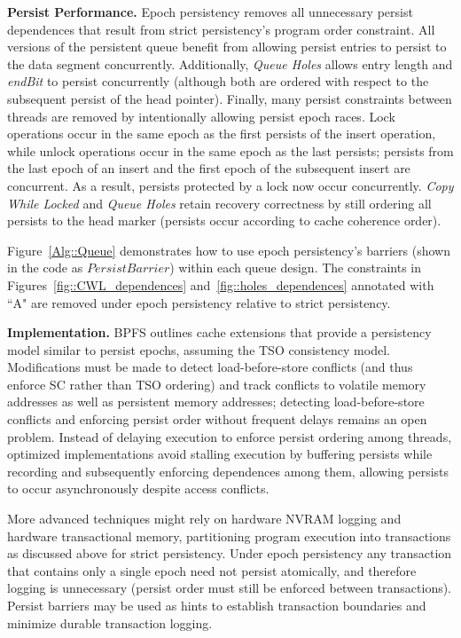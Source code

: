 \textbf{Persist Performance.}
Epoch persistency removes all unnecessary persist dependences that result from strict persistency's program order constraint.
All versions of the persistent queue benefit from allowing persist entries to persist to the data segment concurrently.
Additionally, \emph{Queue Holes} allows entry length and \emph{endBit} to persist concurrently (although both are ordered with respect to the subsequent persist of the head pointer).
Finally, many persist constraints between threads are removed by intentionally allowing persist epoch races.
Lock operations occur in the same epoch as the first persists of the insert operation, while unlock operations occur in the same epoch as the last persists; persists from the last epoch of an insert and the first epoch of the subsequent insert are concurrent.
As a result, persists protected by a lock now occur concurrently.
\emph{Copy While Locked} and \emph{Queue Holes} retain recovery correctness by still ordering all persists to the head marker (persists occur according to cache coherence order).

Figure~\ref{Alg::Queue} demonstrates how to use epoch persistency's barriers (shown in the code as $PersistBarrier$) within each queue design.
The constraints in Figures~\ref{fig::CWL_dependences} and~\ref{fig::holes_dependences} annotated with ``A" are removed under epoch persistency relative to strict persistency.

\textbf{Implementation.}
BPFS \cite{ConditNightingale09} outlines cache extensions that provide a persistency model similar to persist epochs, assuming the TSO consistency model.
Modifications must be made to detect load-before-store conflicts (and thus enforce SC rather than TSO ordering) and track conflicts to volatile memory addresses as well as persistent memory addresses; detecting load-before-store conflicts and enforcing persist order without frequent delays remains an open problem.
Instead of delaying execution to enforce persist ordering among threads, optimized implementations avoid stalling execution by buffering persists while recording and subsequently enforcing dependences among them, allowing persists to occur asynchronously despite access conflicts.

More advanced techniques might rely on hardware NVRAM logging and hardware transactional memory, partitioning program execution into transactions as discussed above for strict persistency.
Under epoch persistency any transaction that contains only a single epoch need not persist atomically, and therefore logging is unnecessary (persist order must still be enforced between transactions).
Persist barriers may be used as hints to establish transaction boundaries and minimize durable transaction logging.

